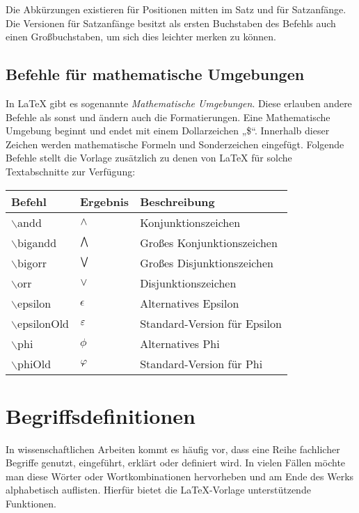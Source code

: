 				Die Abkürzungen existieren für Positionen mitten im Satz und für Satzanfänge. Die Versionen für Satzanfänge besitzt als ersten Buchstaben des Befehls auch einen Großbuchstaben, um sich dies leichter merken zu können.

			\subsection{Befehle für mathematische Umgebungen}

				In \LaTeX{} gibt es sogenannte \emph{Mathematische Umgebungen}. Diese erlauben andere Befehle als sonst und ändern auch die Formatierungen. Eine Mathematische Umgebung beginnt und endet mit einem Dollarzeichen „\$“. Innerhalb dieser Zeichen werden mathematische Formeln und Sonderzeichen eingefügt. Folgende Befehle stellt die Vorlage zusätzlich zu denen von \LaTeX{} für solche Textabschnitte zur Verfügung: \newline

				\begin{tabular}{|p{5 cm}|p{4 cm}|p{5 cm}|}
					\hline \textbf{Befehl} & \textbf{Ergebnis} & \textbf{Beschreibung} \\
					\hline $\backslash$andd & $\wedge$ & Konjunktionszeichen \\
					\hline $\backslash$bigandd & $\bigwedge$ & Großes Konjunktionszeichen \\
					\hline $\backslash$bigorr & $\bigvee$ & Großes Disjunktionszeichen \\
					\hline $\backslash$orr & $\vee$ & Disjunktionszeichen \\
					\hline $\backslash$epsilon & $\epsilon$ & Alternatives Epsilon \\
					\hline $\backslash$epsilonOld & $\epsilonOld$ & Standard-Version für Epsilon \\
					\hline $\backslash$phi & $\phi$ & Alternatives Phi \\
					\hline $\backslash$phiOld & $\phiOld$ & Standard-Version für Phi \\
					\hline
				\end{tabular}

		\section{Begriffsdefinitionen}

			In wissenschaftlichen Arbeiten kommt es häufig vor, dass eine Reihe fachlicher Begriffe genutzt, eingeführt, erklärt oder definiert wird. In vielen Fällen möchte man diese Wörter oder Wortkombinationen hervorheben und am Ende des Werks alphabetisch auflisten. Hierfür bietet die \LaTeX{}-Vorlage unterstützende Funktionen.

